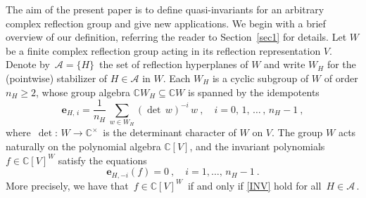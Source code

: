 \documentclass{amsart}
\theoremstyle{definition}
\theoremstyle{remark}
\numberwithin{equation}{section}
\begin{document}
The aim of the present paper is to define quasi-invariants for an arbitrary complex reflection group and
give new applications. We begin with a brief overview of our definition, referring the reader to
Section~\ref{sec1} for details.
Let $ W $ be a finite complex reflection group acting in its reflection representation $ V $. Denote by
$\, {\mathcal{A}} = \{H\} \,$ the set of reflection hyperplanes of $ W $ and write $ W_H $ for the (pointwise) stabilizer of
$ H \in {\mathcal{A}} $ in $W$. Each $ W_H $ is a cyclic subgroup of $W$ of order $ n_H \ge 2 $, whose group algebra
$ {\mathbb{C}} W_H \subseteq {\mathbb{C}} W $  is spanned by the idempotents
$$
{\boldsymbol{e}}_{H,\, i} = \frac{1}{n_H}\,\sum_{w \in W_H} (\det\,w)^{-i} \, w \ , \quad
i = 0,\,1,\,\ldots\,,\,n_H-1\ ,
$$
where $\,\det:\,W \to {\mathbb{C}}^{\times} \,$ is the determinant character of $W$ on $V$.
The group $W$ acts naturally on the polynomial algebra $ {\mathbb{C}}[V]$, and the
invariant polynomials $ f \in {\mathbb{C}}[V]^W $ satisfy the equations
\begin{equation}
\label{INV} {\boldsymbol{e}}_{H, -i} (f) = 0 \ ,\quad i = 1, \ldots,\, n_H-1 \ .
\end{equation}
More precisely, we have that $\,f \in {\mathbb{C}}[V]^W \,$ if and only if \eqref{INV} hold for all $\,H \in {\mathcal{A}} \,$.
\end{document}
